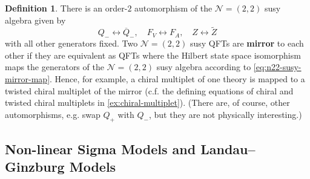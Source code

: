 \documentclass{report}
\theoremstyle{plain}
\theoremstyle{definition}
\newtheorem{definition}[theorem]{Definition}
\theoremstyle{remark}
\newcommand{\cN}{\mathcal{N}}
\newcommand{\cnj}{\overline}
\begin{document}
\begin{definition}
  There is an order-$2$ automorphism of the $\cN=(2,2)$ susy algebra
  given by
  \begin{equation} \label{eq:n22-susy-mirror-map}
    Q_- \longleftrightarrow \cnj Q_-, \quad F_V \longleftrightarrow F_A, \quad Z \longleftrightarrow \tilde Z
  \end{equation}
  with all other generators fixed. Two $\cN=(2,2)$ susy QFTs are {\bf
    mirror} to each other if they are equivalent as QFTs where the
  Hilbert state space isomorphism maps the generators of the
  $\cN=(2,2)$ susy algebra according to \eqref{eq:n22-susy-mirror-map}.
  Hence, for example, a chiral multiplet of one theory is mapped to a
  twisted chiral multiplet of the mirror (c.f. the defining equations
  of chiral and twisted chiral multiplets in
  \ref{ex:chiral-multiplet}). (There are, of course, other
  automorphisms, e.g. swap $Q_+$ with $Q_-$, but they are not
  physically interesting.)
\end{definition}

\subsection{Non-linear Sigma Models and Landau--Ginzburg Models}
\end{document}
